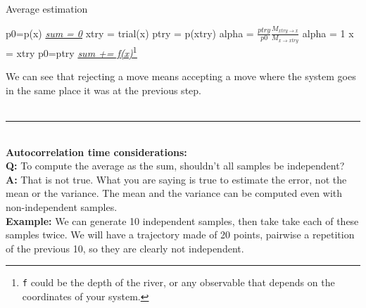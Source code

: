 \begin{minipage}{\textwidth}
\renewcommand*\footnoterule{}
\begin{savenotes}
\begin{algorithm}[H]\label{metropolis_with_average}
			\caption{Average estimation}
			\begin{algorithmic}[0]
				\State p0=p(x)
				\State \underline{\emph{sum = 0}}
					\State xtry = trial(x)
					\State ptry = p(xtry)
					\State alpha =  $\frac{ptry}{p0}\frac{M_{xtry \rightarrow x}}{M_{x\rightarrow xtry}}$
						\State alpha = 1
					\EndIf
						\State x = xtry
						\State p0=ptry
					\EndIf
					\State \underline{\emph{sum += f(x)}\footnote{\texttt{f} could be the depth of the river, or any observable that depends on the coordinates of your system.}}
				\EndFor
			\end{algorithmic}
		\end{algorithm}
\end{savenotes}
\end{minipage}
We can see that rejecting a move means accepting a move where the system goes in the same place it was at the previous step.\\
\\
\noindent\rule{8cm}{0.4pt}\\
\textbf{Autocorrelation time considerations:}\\
\textbf{Q: }To compute the average as the sum, shouldn't all samples be independent?\\
\textbf{A: }That is not true. What you are saying is true to estimate the error, not the mean or the variance. The mean and the variance can be computed even with non-independent samples.\\ 
\textbf{Example: }We can generate 10 independent samples, then take take each of these samples twice. We will have a trajectory made of 20 points, pairwise a repetition of the previous 10, so they are clearly not independent.\\
